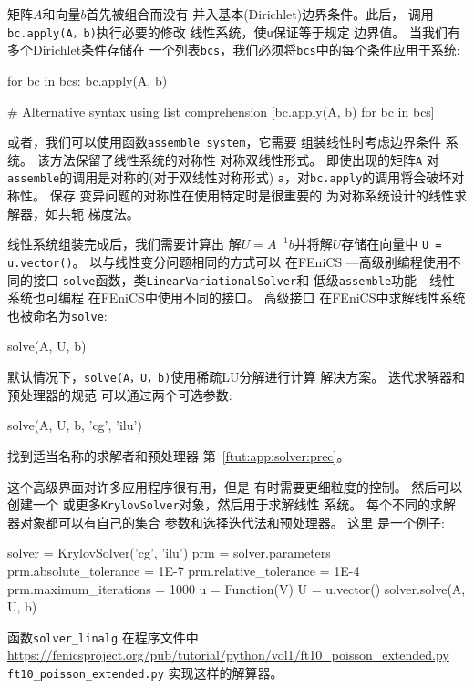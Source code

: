 矩阵$A$和向量$b$首先被组合而没有
并入基本(Dirichlet)边界条件。此后，
调用\texttt{bc.apply(A，b)}执行必要的修改
线性系统，使\texttt{u}保证等于规定
边界值。 当我们有多个Dirichlet条件存储在
一个列表\texttt{bcs}，我们必须将\texttt{bcs}中的每个条件应用于系统:

\begin{python}
for bc in bcs:
    bc.apply(A, b)

# Alternative syntax using list comprehension
[bc.apply(A, b) for bc in bcs]
\end{python}


或者，我们可以使用函数\verb!assemble_system!，它需要
组装线性时考虑边界条件
系统。 该方法保留了线性系统的对称性
对称双线性形式。 即使出现的矩阵\texttt{A}
对\texttt{assemble}的调用是对称的(对于双线性对称形式)
\texttt{a}，对\texttt{bc.apply}的调用将会破坏对称性。 保存
变异问题的对称性在使用特定时是很重要的
为对称系统设计的线性求解器，如共轭
梯度法。

线性系统组装完成后，我们需要计算出
解$U=A^{-1}b$并将解$U$存储在向量中
\texttt{U = u.vector()}。 以与线性变分问题相同的方式可以
在FEniCS ---高级别编程使用不同的接口
\texttt{solve}函数，类\texttt{LinearVariationalSolver}和
低级\texttt{assemble}功能---线性系统也可编程
在FEniCS中使用不同的接口。 高级接口
在FEniCS中求解线性系统也被命名为\texttt{solve}:

\begin{python}
solve(A, U, b)
\end{python}

默认情况下，\texttt{solve(A，U，b)}使用稀疏LU分解进行计算
解决方案。 迭代求解器和预处理器的规范
可以通过两个可选参数:

\begin{python}
solve(A, U, b, 'cg', 'ilu')
\end{python}
找到适当名称的求解者和预处理器
第~\ref{ftut:app:solver:prec}。


这个高级界面对许多应用程序很有用，但是
有时需要更细粒度的控制。 然后可以创建一个
或更多\texttt{KrylovSolver}对象，然后用于求解线性
系统。 每个不同的求解器对象都可以有自己的集合
参数和选择迭代法和预处理器。 这里
是一个例子:

\begin{python}
solver = KrylovSolver('cg', 'ilu')
prm = solver.parameters
prm.absolute_tolerance = 1E-7
prm.relative_tolerance = 1E-4
prm.maximum_iterations = 1000
u = Function(V)
U = u.vector()
solver.solve(A, U, b)
\end{python}
函数\verb!solver_linalg! 在程序文件中
\url{https://fenicsproject.org/pub/tutorial/python/vol1/ft10_poisson_extended.py} {\nolinkurl{ft10_poisson_extended.py}}
实现这样的解算器。

